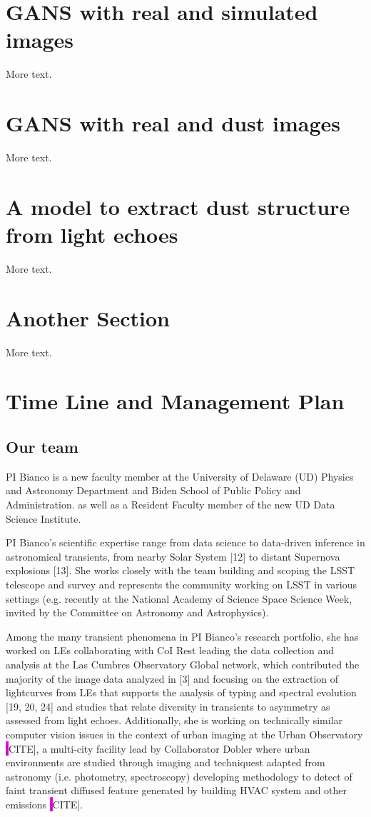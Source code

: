 \documentclass{proposalnsf}
\newcommand{\changeit}[1]{\colorbox{magenta}{#1}}
\begin{document}
\section{GANS with real and simulated images}

More text.

\section{GANS with real and dust images}

More text.

\section{A model to extract dust structure from light echoes}


More text.

\section{Another Section}

More text.


\section{Time Line and Management Plan}

\subsection{Our team}
PI Bianco is a new faculty member at the University of Delaware (UD) Physics and Astronomy Department and Biden School of Public Policy and Administration. as well as a Resident Faculty member of the new UD Data Science Institute.

PI Bianco’s scientific expertise range from data science to data-driven inference in astronomical transients, from nearby Solar System [12] to distant Supernova explosions [13].  She works closely with the team building and scoping the LSST telescope and survey and represents the community working on LSST in various settings (e.g. recently at the National Academy of Science Space Science Week, invited by the Committee on Astronomy and Astrophysics). 

Among the many transient phenomena in PI Bianco’s research portfolio, she has worked on LEs collaborating with CoI Rest leading the data collection and analysis at the Las Cumbres Observatory Global network, which contributed the majority of the image data analyzed in [3] and focusing on the extraction of lightcurves from LEs that supports the analysis of typing and spectral evolution [19, 20, 24]
and studies that relate diversity in transients to asymmetry as assessed from light echoes. Additionally, she is working on technically similar computer vision issues in the context of urban imaging at the Urban Observatory \changeit[CITE], a multi-city facility lead by Collaborator Dobler where urban environments are studied through imaging and techniquest adapted from astronomy (i.e. photometry, spectroscopy) developing methodology to detect of faint transient diffused feature generated by building HVAC system and other emissions \changeit[CITE].
\end{document}
